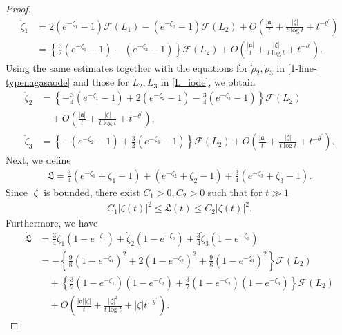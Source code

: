 \documentclass[10pt,a4paper]{amsart}
\numberwithin{equation}{section}
\begin{document}
\begin{proof}
\begin{align*}
\dot{\zeta}_1&=2\left(e^{-\zeta_1}-1\right)\mathcal{F}(L_1)-\left(e^{-\zeta_2}-1\right)\mathcal{F}(L_2)+O\left(\frac{|\mathfrak{a}|}{t}+\frac{|\zeta|}{t\log{t}}+t^{-\theta^{\prime}}\right)
\\
&=\left\{ \frac{3}{2}\left(e^{-\zeta_1}-1\right)-\left(e^{-\zeta_2}-1\right)\right\}\mathcal{F}(L_2)+O\left(\frac{|\mathfrak{a}|}{t}+\frac{|\zeta|}{t\log{t}}+t^{-\theta^{\prime}}\right).
\end{align*}
Using the same estimates together with the equations for $\dot{\rho}_2,\dot{\rho}_3$ in
\eqref{1-line-typenagasaode} and those for $\dot{L}_2,\dot{L}_3$ in \eqref{L_iode}, we obtain
\begin{align*}
\dot{\zeta}_2&=\left\{-\frac{3}{4}\left(e^{-\zeta_1}-1\right)+2\left(e^{-\zeta_2}-1\right)-\frac{3}{4}\left(e^{-\zeta_3}-1\right)\right\}\mathcal{F}(L_2)
\\
&\quad+O\left(\frac{|\mathfrak{a}|}{t}+\frac{|\zeta|}{t\log{t}}+t^{-\theta^{\prime}}\right),
\\
\dot{\zeta}_3&=\left\{-\left(e^{-\zeta_2}-1\right)+\frac{3}{2}\left(e^{-\zeta_3}-1\right) \right\}\mathcal{F}(L_2)+O\left(\frac{|\mathfrak{a}|}{t}+\frac{|\zeta|}{t\log{t}}+t^{-\theta^{\prime}}\right).
\end{align*}
Next, we define
\begin{align*}
\mathfrak{L}=\frac{3}{4}\left(e^{-\zeta_1}+\zeta_1-1\right)+\left(e^{-\zeta_2}+\zeta_2-1\right)+\frac{3}{4}\left(e^{-\zeta_3}+\zeta_3-1\right).
\end{align*}
Since $|\zeta|$ is bounded, there exist $C_1>0, C_2>0$ such that for $t\gg 1$
\begin{align}\label{mathfraksim1}
C_1|\zeta(t)|^2\leq \mathfrak{L}(t)\leq C_2|\zeta(t)|^2.
\end{align}
Furthermore, we have
\begin{align*}
\dot{\mathfrak{L}}&=\frac{3}{4}\dot{\zeta}_1\left(1-e^{-\zeta_1}\right)+\dot{\zeta}_2\left(1-e^{-\zeta_2}\right)+\frac{3}{4}\dot{\zeta}_3\left(1-e^{-\zeta_3}\right)
\\
&=-\left\{ \frac{9}{8}\left(1-e^{-\zeta_1}\right)^2+2\left(1-e^{-\zeta_2}\right)^2+\frac{9}{8}\left(1-e^{-\zeta_3}\right)^2\right\}\mathcal{F}(L_2)
\\
&\quad+\left\{\frac{3}{2}\left(1-e^{-\zeta_1}\right)\left(1-e^{-\zeta_2}\right)+\frac{3}{2}\left(1-e^{-\zeta_2}\right)\left(1-e^{-\zeta_3}\right) \right\}\mathcal{F}(L_2)
\\
&\quad+O\left(\frac{|\mathfrak{a}||\zeta|}{t}+\frac{|\zeta|^2}{t\log{t}}+|\zeta|t^{-\theta^{\prime}}\right).

\end{align*}
\end{proof}
\end{document}
